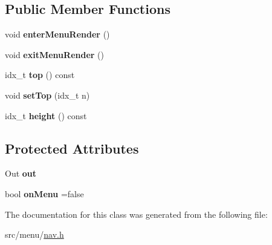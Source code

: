 \subsection*{Public Member Functions}
\begin{DoxyCompactItemize}
\item 
\mbox{\label{classNavBase_ab58aa10c55c447b1042ce8205bafa022}} 
void {\bfseries enter\+Menu\+Render} ()
\item 
\mbox{\label{classNavBase_af888087e8a6ffeb27b26b2c3a193a336}} 
void {\bfseries exit\+Menu\+Render} ()
\item 
\mbox{\label{classNavBase_af6c2f27234f2263b952cca4ced1cacbb}} 
idx\+\_\+t {\bfseries top} () const
\item 
\mbox{\label{classNavBase_a9218d451601bf374c40700cbd5a0a6eb}} 
void {\bfseries set\+Top} (idx\+\_\+t n)
\item 
\mbox{\label{classNavBase_a012d79c482771a3b6180f1e45bdcae4f}} 
idx\+\_\+t {\bfseries height} () const
\end{DoxyCompactItemize}
\subsection*{Protected Attributes}
\begin{DoxyCompactItemize}
\item 
\mbox{\label{classNavBase_a09481cdd6aa1e7765d94096851792f40}} 
Out {\bfseries out}
\item 
\mbox{\label{classNavBase_a36c9a55bbcf72b3bedfdf02220b65b43}} 
bool {\bfseries on\+Menu} =false
\end{DoxyCompactItemize}


The documentation for this class was generated from the following file\+:\begin{DoxyCompactItemize}
\item 
src/menu/\hyperlink{nav_8h}{nav.\+h}\end{DoxyCompactItemize}
